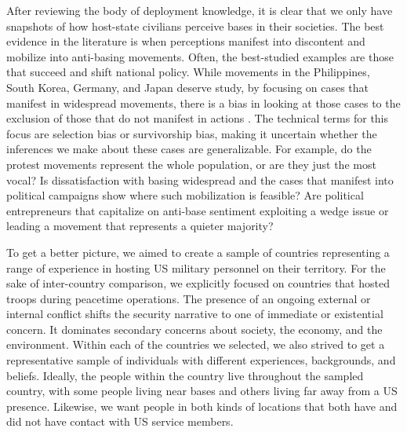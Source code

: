 After reviewing the body of deployment knowledge, it is clear that we only have snapshots of how host-state civilians perceive bases in their societies. The best evidence in the literature is when perceptions manifest into discontent and mobilize into anti-basing movements. Often, the best-studied examples are those that succeed and shift national policy.  While movements in the Philippines, South Korea, Germany, and Japan deserve study, by focusing on cases that manifest in widespread movements, there is a bias in looking at those cases to the exclusion of those that do not manifest in actions \cite{Geddes1990}. The technical terms for this focus are selection bias or survivorship bias, making it uncertain whether the inferences we make about these cases are generalizable. For example, do the protest movements represent the whole population, or are they just the most vocal? Is dissatisfaction with basing widespread and the cases that manifest into political campaigns show where such mobilization is feasible? Are political entrepreneurs that capitalize on anti-base sentiment exploiting a wedge issue or leading a movement that represents a quieter majority?

To get a better picture, we aimed to create a sample of countries representing a range of experience in hosting US military personnel on their territory. For the sake of inter-country comparison, we explicitly focused on countries that hosted troops during peacetime operations. The presence of an ongoing external or internal conflict shifts the security narrative to one of immediate or existential concern. It dominates secondary concerns about society, the economy, and the environment. Within each of the countries we selected, we also strived to get a representative sample of individuals with different experiences, backgrounds, and beliefs. Ideally, the people within the country live throughout the sampled country, with some people living near bases and others living far away from a US presence. Likewise, we want people in both kinds of locations that both have and did not have contact with US service members. 


